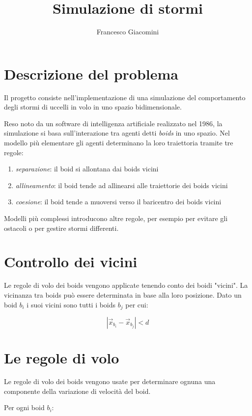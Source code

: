 \documentclass[]{article}
\begin{document}
\title{Simulazione di stormi}
\author{Francesco Giacomini}
\maketitle

\tableofcontents

\section{Descrizione del problema}

Il progetto consiste nell'implementazione di una simulazione del comportamento degli stormi di uccelli in volo in uno
spazio bidimensionale.

Reso noto da un software di intelligenza artificiale realizzato nel 1986, la simulazione si basa sull'interazione tra
agenti detti \emph{boids} in uno spazio. Nel modello più elementare gli agenti determinano la loro traiettoria tramite tre
regole:
\begin{enumerate}
\item \emph{separazione}: il boid si allontana dai boids vicini
\item \emph{allineamento}: il boid tende ad allinearsi alle traiettorie dei boids vicini
\item \emph{coesione}: il boid tende a muoversi verso il baricentro dei boids vicini
\end{enumerate}
Modelli più complessi introducono altre regole, per esempio per evitare gli ostacoli o per gestire stormi differenti.

\section{Controllo dei vicini}

Le regole di volo dei boids vengono applicate tenendo conto dei boidi "vicini".
La vicinanza tra boids può essere determinata in base alla loro posizione. Dato un boid $b_i$ i suoi vicini sono tutti i boids $b_j$ per cui:

$$|\vec{x}_{b_i}-\vec{x}_{b_j}|<d$$

\section{Le regole di volo}

Le regole di volo dei boids vengono usate per determinare ognuna una componente della variazione di velocità del boid.

Per ogni boid $b_i$:
\end{document}
